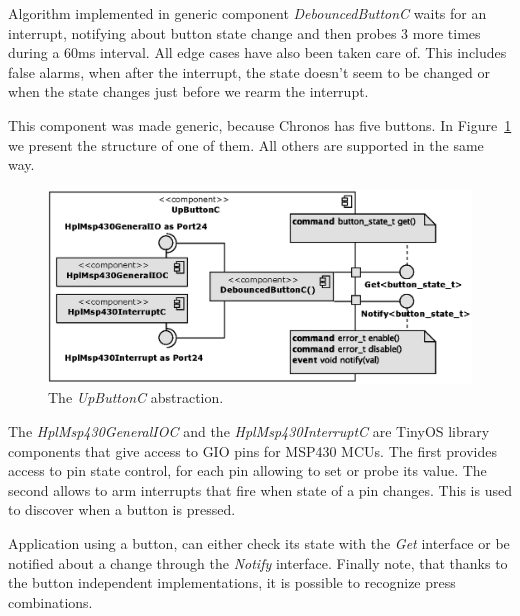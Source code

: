 Algorithm implemented in generic component \emph{DebouncedButtonC} waits for an interrupt, notifying about button state change and then probes 3 more times during a 60ms interval. All edge cases have also been taken care of. This includes false alarms, when after the interrupt, the state doesn't seem to be changed or when the state changes just before we rearm the interrupt.

This component was made generic, because Chronos has five buttons. In Figure~\ref{fig:UpButtonC} we present the structure of one of them. All others are supported in the same way.
\begin{figure}[h]
  \centering
  \includegraphics{diagrams/UpButtonC.eps}
  \caption{The \emph{UpButtonC} abstraction.}
  \label{fig:UpButtonC}
\end{figure}
The \emph{HplMsp430GeneralIOC} and the \emph{HplMsp430InterruptC} are TinyOS library components that give access to GIO pins for MSP430 MCUs. The first provides access to pin state control, for each pin allowing to set or probe its value. The second allows to arm interrupts that fire when state of a pin changes. This is used to discover when a button is pressed.

Application using a button, can either check its state with the \emph{Get} interface or be notified about a change through the \emph{Notify} interface. Finally note, that thanks to the button independent implementations, it is possible to recognize press combinations.

\begin{lstlisting}
\end{lstlisting}




